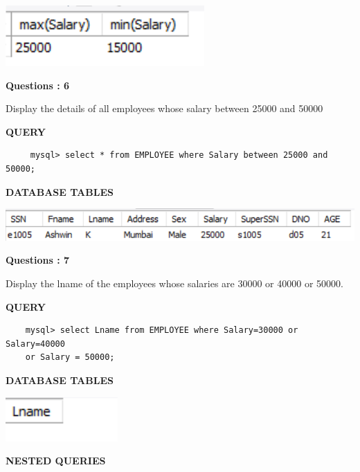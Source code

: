 \documentclass[a4paper,12pt]{report}
\begin{document}
\includegraphics[scale=1.2]{Q5.png}

\begin{flushleft}
    \textbf{Questions : 6}
\end{flushleft}
Display the details of all employees whose salary between 25000 and 50000
	\begin{flushleft}
		\textbf{QUERY }
	\end{flushleft}
 \begin{verbatim}
     mysql> select * from EMPLOYEE where Salary between 25000 and 50000;
 \end{verbatim}
\begin{flushleft}
		\textbf{DATABASE TABLES} 
\end{flushleft} 

\includegraphics[scale=1.2]{Q6.png}

\begin{flushleft}
    \textbf{Questions : 7}
\end{flushleft}
Display the lname of the employees whose salaries are 30000 or 40000 or 50000.
	\begin{flushleft}
		\textbf{QUERY }
	\end{flushleft}
 \begin{verbatim}
    mysql> select Lname from EMPLOYEE where Salary=30000 or Salary=40000
    or Salary = 50000; 
 \end{verbatim}
\begin{flushleft}
		\textbf{DATABASE TABLES} 
\end{flushleft} 

\includegraphics[scale=1.5]{Q7.png}

\newpage
\begin{center}
		\large\textbf{NESTED QUERIES}
	\end{center}
	
\end{document}
